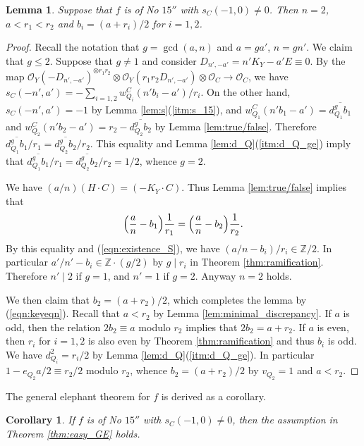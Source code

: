 \documentclass[a4paper,11pt]{amsart}
\newtheorem{lemma}[theorem]{Lemma}
\newtheorem{corollary}[theorem]{Corollary}
\theoremstyle{definition}
\theoremstyle{remark}
\numberwithin{equation}{section}
\newcommand{\bZ}{{\mathbb Z}}
\newcommand{\cO}{{\mathcal O}}
\begin{document}
\begin{lemma}\label{lem:n=2}
Suppose that $f$ is of No $\textrm{15}''$ with $s_C(-1,0)\neq0$.
Then $n=2$, $a<r_1<r_2$ and $b_i=(a+r_i)/2$ for $i=1,2$.
\end{lemma}

\begin{proof}
Recall the notation that $g=\gcd(a,n)$ and $a=ga'$, $n=gn'$.
We claim that $g\le2$.
Suppose that $g \neq 1$ and consider $D_{n',-a'}=n'K_Y-a'E \equiv 0$.
By the map
$\cO_Y(-D_{n',-a'})^{\otimes r_1r_2} \otimes \cO_Y(r_1r_2D_{n',-a'})
\otimes \cO_C \to \cO_C$,
we have
$s_C(-n',a')=-\sum_{i=1,2}w_{Q_i}^C(n'b_i-a')/r_i$.
On the other hand,
$s_C(-n',a')=-1$ by Lemma \ref{lem:s}(\ref{itm:s_15}),
and $w_{Q_1}^C(n'b_1-a')=\overline{d_{Q_1}^gb_1}$ and
$w_{Q_2}^C(n'b_2-a')=r_2-\overline{d_{Q_2}^gb_2}$
by Lemma \ref{lem:true/false}.
Therefore $\overline{d_{Q_1}^gb_1}/r_1=\overline{d_{Q_2}^gb_2}/r_2$.
This equality and Lemma \ref{lem:d_Q}(\ref{itm:d_Q_ge}) imply that
$\overline{d_{Q_1}^gb_1}/r_1=\overline{d_{Q_2}^gb_2}/r_2=1/2$,
whence $g=2$.

We have $(a/n)(H \cdot C)=(-K_Y \cdot C)$.
Thus Lemma \ref{lem:true/false} implies that
\begin{align}\label{eqn:keyeqn}
\Bigl(\frac{a}{n}-b_1\Bigr)\frac{1}{r_1}=
\Bigl(\frac{a}{n}-b_2\Bigr)\frac{1}{r_2}.
\end{align}
By this equality and (\ref{eqn:existence_S}),
we have $(a/n-b_i)/r_i \in \bZ/2$.
In particular $a'/n'-b_i \in \bZ \cdot (g/2)$
by $g \mid r_i$ in Theorem \ref{thm:ramification}.
Therefore $n' \mid 2$ if $g=1$, and $n'=1$ if $g=2$.
Anyway $n=2$ holds.

We then claim that $b_2=(a+r_2)/2$,
which completes the lemma by (\ref{eqn:keyeqn}).
Recall that $a<r_2$ by Lemma \ref{lem:minimal_discrepancy}.
If $a$ is odd,
then the relation $2b_2 \equiv a$ modulo $r_2$ implies that $2b_2=a+r_2$.
If $a$ is even,
then $r_i$ for $i=1,2$ is also even by Theorem \ref{thm:ramification}
and thus $b_i$ is odd.
We have $d_{Q_i}^2=r_i/2$ by Lemma \ref{lem:d_Q}(\ref{itm:d_Q_ge}).
In particular $1-e_{Q_2}a/2 \equiv r_2/2$ modulo $r_2$,
whence $b_2=(a+r_2)/2$ by $v_{Q_2}=1$ and $a<r_2$.
\end{proof}

The general elephant theorem for $f$ is derived as a corollary.

\begin{corollary}\label{cor:easy_GE_D}
If $f$ is of No $\textrm{15}''$ with $s_C(-1,0)\neq0$,
then the assumption in Theorem \textup{\ref{thm:easy_GE}} holds.
\end{corollary}
\end{document}
